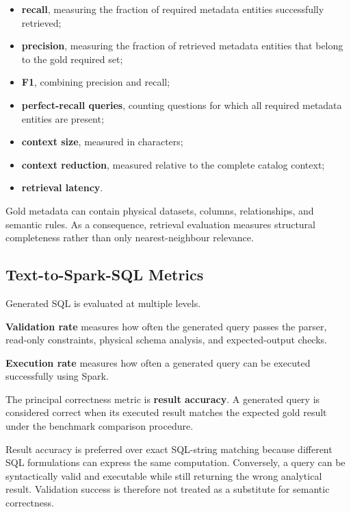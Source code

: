 \begin{itemize}

    \item \textbf{recall}, measuring the fraction of required metadata entities
    successfully retrieved;

    \item \textbf{precision}, measuring the fraction of retrieved metadata
    entities that belong to the gold required set;

    \item \textbf{F1}, combining precision and recall;

    \item \textbf{perfect-recall queries}, counting questions for which all
    required metadata entities are present;

    \item \textbf{context size}, measured in characters;

    \item \textbf{context reduction}, measured relative to the complete
    catalog context;

    \item \textbf{retrieval latency}.

\end{itemize}

Gold metadata can contain physical datasets, columns, relationships, and
semantic rules. As a consequence, retrieval evaluation measures structural
completeness rather than only nearest-neighbour relevance.


\subsection{Text-to-Spark-SQL Metrics}

Generated SQL is evaluated at multiple levels.

\textbf{Validation rate} measures how often the generated query passes the
parser, read-only constraints, physical schema analysis, and expected-output
checks.

\textbf{Execution rate} measures how often a generated query can be executed
successfully using Spark.

The principal correctness metric is \textbf{result accuracy}. A generated
query is considered correct when its executed result matches the expected
gold result under the benchmark comparison procedure.

Result accuracy is preferred over exact SQL-string matching because different
SQL formulations can express the same computation. Conversely, a query can be
syntactically valid and executable while still returning the wrong analytical
result. Validation success is therefore not treated as a substitute for
semantic correctness.


